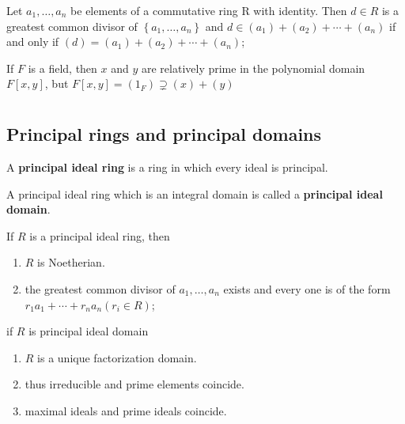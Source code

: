 \begin{theorem}
    Let $a_1, \ldots, a_{n}$ be elements of a commutative ring R with identity. Then
    $d \in R$ is a greatest common divisor of $\left\{a_1, \ldots, a_{n}\right\}$ and $d\in \left(a_1\right)+\left(a_2\right)+\cdots+\left(a_{n}\right)$ if and only if $(d)=\left(a_1\right)+\left(a_2\right)+\cdots+\left(a_{n}\right)$;


    If $F$ is a field, then $x$ and $y$ are relatively prime in the polynomial domain $F[x, y]$, but $F[x, y]=\left(1_F\right) \supsetneq (x)+(y)$ 
\end{theorem}


\section{}

\subsection{Principal rings and principal domains} %
\begin{definition}
    A \textbf{principal ideal ring}
    is a ring in which every ideal is principal.

    A principal ideal ring which is an integral
    domain is called a \textbf{principal ideal domain}.
\end{definition}

\begin{theorem}
    If $R$ is a principal ideal ring,
    then
    \begin{enumerate}
        \item
              $R$ is Noetherian.
        \item
              the greatest common divisor of $a_1, \ldots, a_{n}$ exists and every one is of the form $r_1 a_1+\cdots+r_{n} a_{n}\left(r_{i} \in R\right)$;
    \end{enumerate}
    if $R$ is principal ideal domain
    \begin{enumerate}[resume]
        \item
              $R$ is a unique factorization domain.
        \item
              thus irreducible and prime elements coincide.
        \item maximal ideals and prime ideals coincide.
    \end{enumerate}
\end{theorem}

